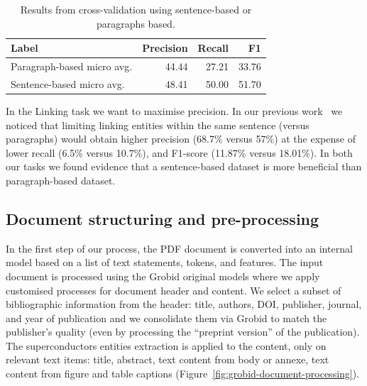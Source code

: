 \documentclass[]{interact}
\theoremstyle{plain}%
\theoremstyle{definition}
\theoremstyle{remark}
\begin{document}
\begin{table}[ht]
    \centering\small
    \begin{tabular}{lrrr}
        \toprule
        \textbf{Label}             & \textbf{Precision} & \textbf{Recall} & \textbf{F1} \\
        \midrule
        Paragraph-based micro avg. & 44.44              & 27.21           & 33.76       \\
        Sentence-based micro avg.  & 48.41              & 50.00           & 51.70       \\
        \bottomrule
    \end{tabular}
    \caption{\label{tab:comparison-evaluation-sentences-paragraphs} Results from cross-validation using sentence-based or paragraphs based.  }
\end{table}

In the Linking task we want to maximise precision.
In our previous work~\cite{foppiano2019proposal} we noticed that limiting linking entities within the same sentence (versus paragraphs) would obtain higher precision (68.7\% versus 57\%) at the expense of lower recall (6.5\% versus 10.7\%), and F1-score (11.87\% versus 18.01\%).
In both our tasks we found evidence that a sentence-based dataset is more beneficial than paragraph-based dataset.


\subsection{Document structuring and pre-processing}
\label{subsubsec:document-structuring}
In the first step of our process, the PDF document is converted into an internal model based on a list of text statements, tokens, and features.
The input document is processed using the Grobid original models where we apply customised processes for document header and content.
We select a subset of bibliographic information from the header: title, authors, DOI, publisher, journal, and year of publication and we consolidate them via Grobid to match the publisher's quality (even by processing the ``preprint version'' of the publication).
The superconductors entities extraction is applied to the content, only on relevant text items: title, abstract, text content from body or annexe, text content from figure and table captions (Figure~\ref{fig:grobid-document-processing}).
\end{document}
